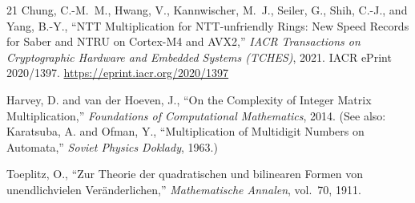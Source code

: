 \documentclass[utf8]{FrontiersinHarvard}
\begin{document}
\begin{thebibliography}{21}
Chung, C.-M.~M., Hwang, V., Kannwischer, M.~J., Seiler, G., Shih, C.-J., and Yang, B.-Y.,
``NTT Multiplication for NTT-unfriendly Rings: New Speed Records for Saber and NTRU on Cortex-M4 and AVX2,''
\emph{IACR Transactions on Cryptographic Hardware and Embedded Systems (TCHES)}, 2021.
IACR ePrint 2020/1397.
\url{https://eprint.iacr.org/2020/1397}

Harvey, D. and van der Hoeven, J.,
``On the Complexity of Integer Matrix Multiplication,''
\emph{Foundations of Computational Mathematics}, 2014.
(See also: Karatsuba, A. and Ofman, Y., ``Multiplication of Multidigit Numbers on Automata,'' \emph{Soviet Physics Doklady}, 1963.)

Toeplitz, O.,
``Zur Theorie der quadratischen und bilinearen Formen von unendlichvielen Ver\"anderlichen,''
\emph{Mathematische Annalen}, vol.~70, 1911.

\end{thebibliography}
\end{document}
